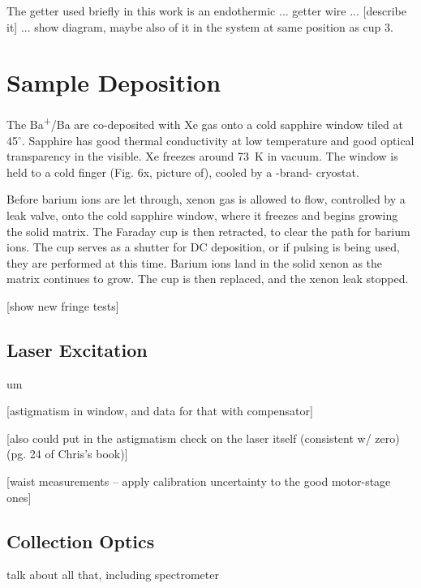 The getter used briefly in this work is an endothermic ... getter wire ... {\color{gray}[describe it]} ... show diagram, maybe also of it in the system at same position as cup 3.

\section{Sample Deposition}

The Ba\textsuperscript{+}/Ba are co-deposited with Xe gas onto a cold sapphire window tiled at 45$^{\circ}$.  Sapphire has good thermal conductivity at low temperature and good optical transparency in the visible.  Xe freezes around {\color{red}73~K} in vacuum.  The window is held to a cold finger (Fig. 6x, picture of), cooled by a -brand- cryostat. %

Before barium ions are let through, xenon gas is allowed to flow, controlled by a leak valve, onto the cold sapphire window, where it freezes and begins growing the solid matrix.  The Faraday cup is then retracted, to clear the path for barium ions.  The cup serves as a shutter for DC deposition, or if pulsing is being used, they are performed at this time.  Barium ions land in the solid xenon as the matrix continues to grow.  The cup is then replaced, and the xenon leak stopped.

[show new fringe tests]

\subsection{Laser Excitation}

um

[astigmatism in window, and data for that with compensator]

[also could put in the astigmatism check on the laser itself (consistent w/ zero) (pg. 24 of Chris's book)]

[waist measurements -- apply calibration uncertainty to the good motor-stage ones]

\subsection{Collection Optics}

talk about all that, including spectrometer